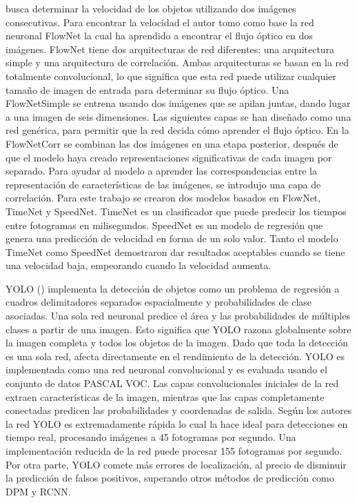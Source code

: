 \citeauthor{loor2017Visual} busca determinar la velocidad de los objetos utilizando dos imágenes consecutivas. Para encontrar la velocidad el autor tomo como base la red neuronal FlowNet la cual ha aprendido a encontrar el flujo óptico en dos imágenes. FlowNet tiene dos arquitecturas de red diferentes: una arquitectura simple y una arquitectura de correlación. Ambas arquitecturas se basan en la red totalmente convolucional, lo que significa que esta red puede utilizar cualquier tamaño de imagen de entrada para determinar su flujo óptico. Una FlowNetSimple se entrena usando dos imágenes que se apilan juntas, dando lugar a una imagen de seis dimensiones. Las siguientes capas se han diseñado como una red genérica, para permitir que la red decida cómo aprender el flujo óptico. En la FlowNetCorr se combinan las dos imágenes en una etapa posterior, después de que el modelo haya creado representaciones significativas de cada imagen por separado. Para ayudar al modelo a aprender las correspondencias entre la representación de características de las imágenes, se introdujo una capa de correlación. Para este trabajo se crearon dos modelos basados en FlowNet, TimeNet y SpeedNet. TimeNet es un clasificador que puede predecir los tiempos entre fotogramas en milisegundos. SpeedNet es un modelo de regresión que genera una predicción de velocidad en forma de un solo valor. Tanto el modelo TimeNet como SpeedNet demostraron dar resultados aceptables cuando se tiene una velocidad baja, empeorando cuando la velocidad aumenta.

YOLO (\cite{redmon2016Yolo}) implementa la detección de objetos como un problema de regresión a cuadros delimitadores separados espacialmente y probabilidades de clase asociadas. Una sola red neuronal predice el área y las probabilidades de múltiples clases a partir de una imagen. Esto significa que YOLO razona globalmente sobre la imagen completa y todos los objetos de la imagen. Dado que toda la detección es una sola red, afecta directamente en el rendimiento de la detección. YOLO es implementada como una red neuronal convolucional y es evaluada usando el conjunto de datos PASCAL VOC. Las capas convolucionales iniciales de la red extraen características de la imagen, mientras que las capas completamente conectadas predicen las probabilidades y coordenadas de salida. Según los autores la red YOLO es extremadamente rápida lo cual la hace ideal para detecciones en tiempo real, procesando imágenes a 45 fotogramas por segundo. Una implementación reducida de la red puede procesar 155 fotogramas por segundo. Por otra parte, YOLO comete más errores de localización, al precio de disminuir la predicción de falsos positivos, superando otros métodos de predicción como DPM y RCNN.
